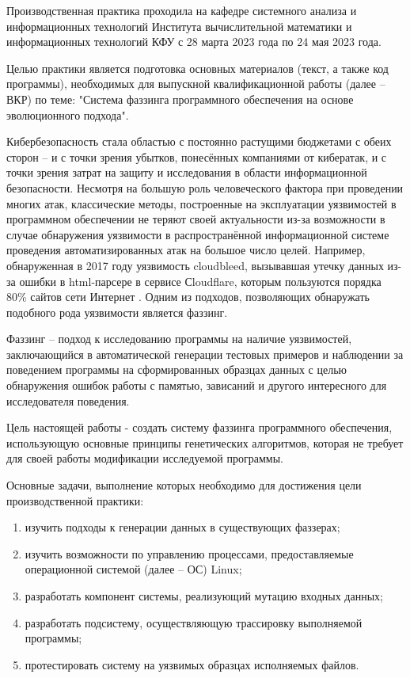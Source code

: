 \label{sec:intro}

Производственная практика проходила на кафедре системного анализа
и информационных технологий Института вычислительной математики и
информационных технологий КФУ с 28 марта 2023 года по 24 мая 2023 года.

Целью практики является подготовка основных материалов (текст, а
также код программы), необходимых для выпускной квалификационной
работы (далее -- ВКР) по теме: "Система фаззинга программного обеспечения на основе эволюционного подхода".

Кибербезопасность стала областью с постоянно растущими бюджетами с обеих сторон -- и с точки зрения убытков, понесённых компаниями от кибератак, и с точки зрения затрат на защиту и исследования в области информационной безопасности. Несмотря на большую роль человеческого фактора при проведении многих атак, классические методы, построенные на эксплуатации уязвимостей в программном обеспечении не теряют своей актуальности из-за возможности в случае обнаружения уязвимости в распространённой информационной системе проведения автоматизированных атак на большое число целей. Например, обнаруженная в 2017 году уязвимость cloudbleed, вызывавшая утечку данных из-за ошибки в html-парсере в сервисе Сloudflare, которым пользуются порядка 80\% сайтов сети Интернет \cite{cloudbleed}. Одним из подходов, позволяющих обнаружать подобного рода уязвимости является фаззинг.

Фаззинг -- подход к исследованию программы на наличие уязвимостей, заключающийся в автоматической генерации тестовых примеров и наблюдении за поведением программы на сформированных образцах данных с целью обнаружения ошибок работы с памятью, зависаний и другого интересного для исследователя поведения.

Цель настоящей работы - создать систему фаззинга программного обеспечения, использующую основные принципы генетических алгоритмов, которая не требует для своей работы модификации исследуемой программы.

Основные задачи, выполнение которых необходимо для достижения цели производственной практики:

\begin{enumerate}
	\item изучить подходы к генерации данных в существующих фаззерах;
	
	\item изучить возможности по управлению процессами, предоставляемые операционной системой (далее -- ОС) Linux;
	
	\item разработать компонент системы, реализующий мутацию входных данных;
	
	\item разработать подсистему, осуществляющую трассировку выполняемой программы;
	
	\item протестировать систему на уязвимых образцах исполняемых файлов.
\end{enumerate}